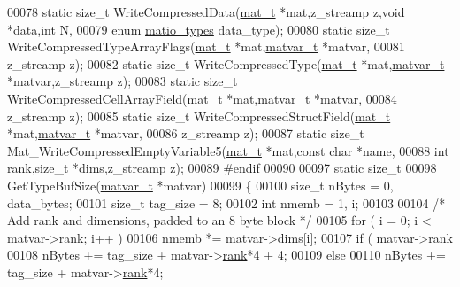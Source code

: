 \begin{DoxyCode}
00078 \textcolor{keyword}{static} \textcolor{keywordtype}{size\_t} WriteCompressedData(\hyperlink{struct__mat__t}{mat\_t} *mat,z\_streamp z,\textcolor{keywordtype}{void} *data,\textcolor{keywordtype}{int} N,
00079                   \textcolor{keyword}{enum} \hyperlink{group___m_a_t_gacf7b3b879282b7ab3a51190e49bf3453}{matio\_types} data\_type);
00080 \textcolor{keyword}{static} \textcolor{keywordtype}{size\_t} WriteCompressedTypeArrayFlags(\hyperlink{struct__mat__t}{mat\_t} *mat,\hyperlink{group___m_a_t_structmatvar__t}{matvar\_t} *matvar,
00081                   z\_streamp z);
00082 \textcolor{keyword}{static} \textcolor{keywordtype}{size\_t} WriteCompressedType(\hyperlink{struct__mat__t}{mat\_t} *mat,\hyperlink{group___m_a_t_structmatvar__t}{matvar\_t} *matvar,z\_streamp z);
00083 \textcolor{keyword}{static} \textcolor{keywordtype}{size\_t} WriteCompressedCellArrayField(\hyperlink{struct__mat__t}{mat\_t} *mat,\hyperlink{group___m_a_t_structmatvar__t}{matvar\_t} *matvar,
00084                   z\_streamp z);
00085 \textcolor{keyword}{static} \textcolor{keywordtype}{size\_t} WriteCompressedStructField(\hyperlink{struct__mat__t}{mat\_t} *mat,\hyperlink{group___m_a_t_structmatvar__t}{matvar\_t} *matvar,
00086                   z\_streamp z);
00087 \textcolor{keyword}{static} \textcolor{keywordtype}{size\_t} Mat\_WriteCompressedEmptyVariable5(\hyperlink{struct__mat__t}{mat\_t} *mat,\textcolor{keyword}{const} \textcolor{keywordtype}{char} *name,
00088                   \textcolor{keywordtype}{int} rank,\textcolor{keywordtype}{size\_t} *dims,z\_streamp z);
00089 \textcolor{preprocessor}{#endif}
00090 
00097 \textcolor{keyword}{static} \textcolor{keywordtype}{size\_t}
00098 GetTypeBufSize(\hyperlink{group___m_a_t_structmatvar__t}{matvar\_t} *matvar)
00099 \{
00100     \textcolor{keywordtype}{size\_t} nBytes = 0, data\_bytes;
00101     \textcolor{keywordtype}{size\_t} tag\_size = 8;
00102     \textcolor{keywordtype}{int}    nmemb = 1, i;
00103 
00104     \textcolor{comment}{/* Add rank and dimensions, padded to an 8 byte block */}
00105     \textcolor{keywordflow}{for} ( i = 0; i < matvar->\hyperlink{group___m_a_t_a84ba70c96ded13cc555fa75b768d9921}{rank}; i++ )
00106         nmemb *= matvar->\hyperlink{group___m_a_t_a8e01234e1c862ce3472bb37f5a09b92c}{dims}[i];
00107     if ( matvar->\hyperlink{group___m_a_t_a84ba70c96ded13cc555fa75b768d9921}{rank} %
00108         nBytes += tag\_size + matvar->\hyperlink{group___m_a_t_a84ba70c96ded13cc555fa75b768d9921}{rank}*4 + 4;
00109     \textcolor{keywordflow}{else}
00110         nBytes += tag\_size + matvar->\hyperlink{group___m_a_t_a84ba70c96ded13cc555fa75b768d9921}{rank}*4;

\end{DoxyCode}
